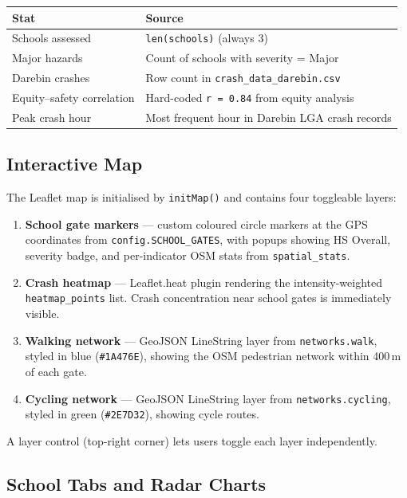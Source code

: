 \documentclass[11pt,a4paper,openany]{book}
\begin{document}
\begin{center}
\begin{tabular}{lL{8cm}}
\toprule
Stat & Source \\
\midrule
Schools assessed & \texttt{len(schools)} (always 3) \\
Major hazards & Count of schools with severity = Major \\
Darebin crashes & Row count in \texttt{crash\_data\_darebin.csv} \\
Equity--safety correlation & Hard-coded \texttt{r = 0.84} from equity analysis \\
Peak crash hour & Most frequent hour in Darebin LGA crash records \\
\bottomrule
\end{tabular}
\end{center}

\subsection{Interactive Map}

The Leaflet map is initialised by \texttt{initMap()} and contains four toggleable layers:

\begin{enumerate}
  \item \textbf{School gate markers} --- custom coloured circle markers at the GPS coordinates
        from \texttt{config.SCHOOL\_GATES}, with popups showing HS Overall, severity badge,
        and per-indicator OSM stats from \texttt{spatial\_stats}.
  \item \textbf{Crash heatmap} --- Leaflet.heat plugin rendering the intensity-weighted
        \texttt{heatmap\_points} list.  Crash concentration near school gates is immediately
        visible.
  \item \textbf{Walking network} --- GeoJSON LineString layer from \texttt{networks.walk},
        styled in blue (\texttt{\#1A476E}), showing the OSM pedestrian network within
        400\,m of each gate.
  \item \textbf{Cycling network} --- GeoJSON LineString layer from \texttt{networks.cycling},
        styled in green (\texttt{\#2E7D32}), showing cycle routes.
\end{enumerate}

A layer control (top-right corner) lets users toggle each layer independently.

\subsection{School Tabs and Radar Charts}
\end{document}
